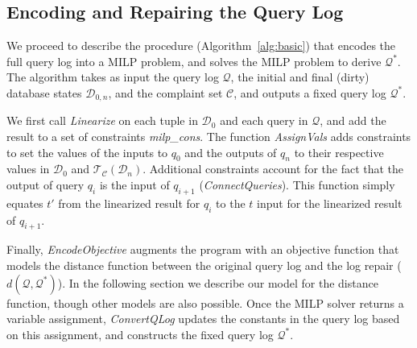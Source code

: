 \subsection{Encoding and Repairing the Query Log}
\label{sec:milp}

We proceed to describe the procedure (Algorithm~\ref{alg:basic}) that encodes 
the full query log into a MILP problem, and solves the MILP problem to derive $\mathcal{Q}^*$.
The algorithm takes as input the query log $\mathcal{Q}$, 
the initial and final (dirty) database states 
$\mathcal{D}_{0, n}$, and the complaint set $\mathcal{C}$, and outputs a fixed query 
log $\mathcal{Q}^*$.  

We first call \textit{Linearize} on each tuple in $\mathcal{D}_0$ and
each query in $\mathcal{Q}$, and add the result to a set of
constraints \textit{milp\_cons}. The function \textit{AssignVals} adds
constraints to set the values of the inputs to $q_0$ and the outputs
of $q_n$ to their respective values in $\mathcal{D}_0$ and
$\mathcal{T}_\mathcal{C}(\mathcal{D}_n)$. Additional constraints
account for the fact that the output of query $q_i$ is the input of
$q_{i+1}$ (\textit{ConnectQueries}). This function simply equates $t'$
from the linearized result for $q_i$ to the $t$ input for the
linearized result of $q_{i+1}$.

Finally, \emph{EncodeObjective} augments the program with an objective
function that models the distance function between the original query
log and the log repair ($d(\mathcal{Q},\mathcal{Q}^*)$). In the
following section we describe our model for the distance function,
though other models are also possible. Once the MILP solver returns a
variable assignment, \textit{ConvertQLog} updates the constants in the
query log based on this assignment, and constructs the fixed query log
$\mathcal{Q}^*$.





